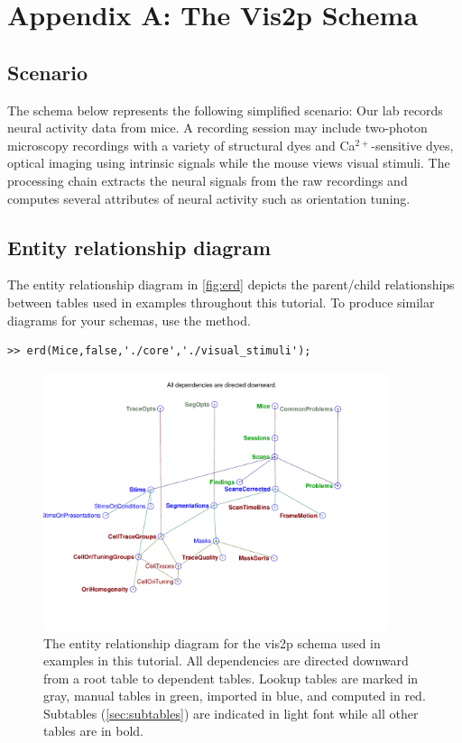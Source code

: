 \documentclass[10pt]{article}
\begin{document}
\section{Appendix A: The Vis2p Schema}\label{sec:vis2p}
\subsection{Scenario}
The schema below represents the following simplified scenario: Our lab records neural activity data from mice. A recording session may include two-photon microscopy recordings with a variety of structural dyes and Ca$^{2+}$-sensitive dyes, optical imaging using intrinsic signals while the mouse views visual stimuli.  The processing chain extracts the neural signals from the raw recordings and computes several attributes of neural activity such as orientation tuning. 

\subsection{Entity relationship diagram}
The entity relationship diagram in \autoref{fig:erd} depicts the parent/child relationships between tables used in examples throughout this tutorial. To produce similar diagrams for your schemas, use the  method.

\begin{lstlisting}
>> erd(Mice,false,'./core','./visual_stimuli');
\end{lstlisting}
\begin{figure}[h]
\center \includegraphics[width=0.9\textwidth]{erd.pdf}
\caption{The entity relationship diagram for the vis2p schema used in examples in this tutorial.  All dependencies are directed downward from a root table to dependent tables. Lookup tables are marked in gray, manual tables in green, imported in blue, and computed in red. Subtables (\autoref{sec:subtables}) are indicated in light font while all other tables are in bold.}
\label{fig:erd}
\end{figure}
\end{document}
